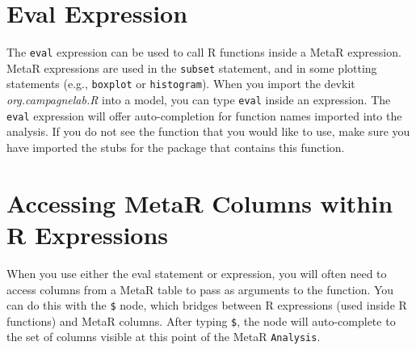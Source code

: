 \section{Eval Expression}\label{sec:EvalExpression}
The \texttt{eval} expression can be used to call R functions inside a MetaR expression. MetaR expressions are used in the \texttt{subset} statement, and in some plotting statements (e.g., \texttt{boxplot} or \texttt{histogram}).  When you import the devkit \textit{org.campagnelab.R} into a model, you can type \texttt{eval} inside an expression. The \texttt{eval} expression will offer auto-completion for function names imported into the analysis. If you do not see the function that you would like to use, make sure you have imported the stubs for the package that contains this function. 


\section{Accessing MetaR Columns within R Expressions}\label{sec:AccessingMetaRColumns}
When you use either the eval statement or expression, you will often need to access columns from a MetaR table to pass as arguments to the function. You can do this with the \texttt{\$} node, which bridges between R expressions (used inside R functions) and MetaR columns. After typing \texttt{\$}, the node will auto-complete to the set of columns visible at this point of the MetaR \texttt{Analysis}. 


